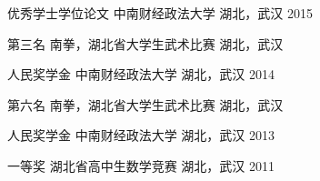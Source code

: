 \begin{cvhonors}


\cvhonor
{优秀学士学位论文} %
{中南财经政法大学} %
{湖北，武汉} %
{2015} %



\cvhonor
{第三名} %
{南拳，湖北省大学生武术比赛} %
{湖北，武汉} %
{ } %


\cvhonor
{人民奖学金} %
{中南财经政法大学} %
{湖北，武汉} %
{2014} %


\cvhonor
{第六名} %
{南拳，湖北省大学生武术比赛} %
{湖北，武汉} %
{ } %


\cvhonor
{人民奖学金} %
{中南财经政法大学} %
{湖北，武汉} %
{2013} %


\cvhonor
{一等奖} %
{湖北省高中生数学竞赛} %
{湖北，武汉} %
{2011} %

\end{cvhonors}